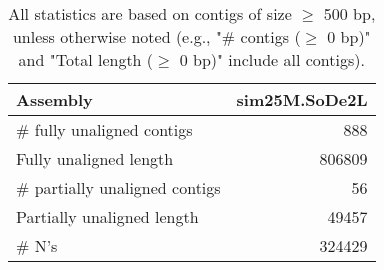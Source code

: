 \documentclass[12pt,a4paper]{article}
\begin{document}
\begin{table}[ht]
\begin{center}
\caption{All statistics are based on contigs of size $\geq$ 500 bp, unless otherwise noted (e.g., "\# contigs ($\geq$ 0 bp)" and "Total length ($\geq$ 0 bp)" include all contigs).}
\begin{tabular}{|l*{1}{|r}|}
\hline
Assembly & sim25M.SoDe2L \\ \hline
\# fully unaligned contigs & 888 \\ \hline
Fully unaligned length & 806809 \\ \hline
\# partially unaligned contigs & 56 \\ \hline
Partially unaligned length & 49457 \\ \hline
\# N's & 324429 \\ \hline
\end{tabular}
\end{center}
\end{table}
\end{document}
